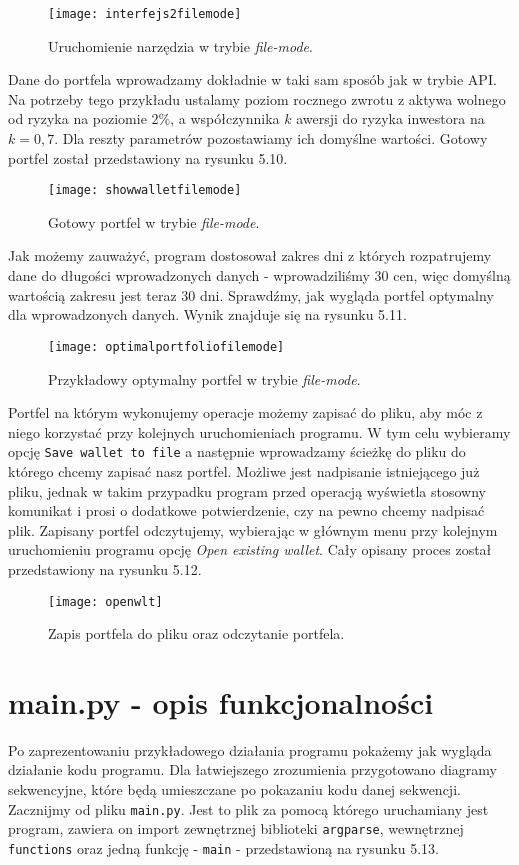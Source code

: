 \documentclass[magister]{dyplom}
\def\code#1{\texttt{#1}}
\begin{document}
\begin{figure}[ht!]
	\centering
	\texttt{[image: interfejs2filemode]}
	\caption{Uruchomienie narzędzia w trybie \textit{file-mode}.}
\end{figure}


Dane do portfela wprowadzamy dokładnie w taki sam sposób jak w trybie API. Na potrzeby tego przykładu ustalamy poziom rocznego zwrotu z aktywa wolnego od ryzyka na poziomie $2 \%$, a współczynnika $k$ awersji do ryzyka inwestora na $k=0,7$. Dla reszty parametrów pozostawiamy ich domyślne wartości. Gotowy portfel został przedstawiony na rysunku 5.10.

\begin{figure}[ht]
	\centering
	\texttt{[image: showwalletfilemode]}
	\caption{Gotowy portfel w trybie \textit{file-mode}.}
\end{figure}
Jak możemy zauważyć, program dostosował zakres dni z których rozpatrujemy dane do długości wprowadzonych danych - wprowadziliśmy 30 cen, więc domyślną wartością zakresu jest teraz 30 dni.
Sprawdźmy, jak wygląda portfel optymalny dla wprowadzonych danych. Wynik znajduje się na rysunku 5.11.
\newpage
\begin{figure}[ht!]
	\centering
	\texttt{[image: optimalportfoliofilemode]}
	\caption{Przykładowy optymalny portfel w trybie \textit{file-mode}.}
\end{figure}

Portfel na którym wykonujemy operacje możemy zapisać do pliku, aby móc z niego korzystać przy kolejnych uruchomieniach programu. W tym celu wybieramy opcję \code{Save wallet to file} a następnie wprowadzamy ścieżkę do pliku do którego chcemy zapisać nasz portfel. Możliwe jest nadpisanie istniejącego już pliku, jednak w takim przypadku program przed operacją wyświetla stosowny komunikat i prosi o dodatkowe potwierdzenie, czy na pewno chcemy nadpisać plik. Zapisany portfel odczytujemy, wybierając w głównym menu przy kolejnym uruchomieniu programu opcję \textit{Open existing wallet}. Cały opisany proces został przedstawiony na rysunku 5.12.

\begin{figure}[ht!]
	\centering
	\texttt{[image: openwlt]}
	\caption{Zapis portfela do pliku oraz odczytanie portfela.}
\end{figure}
\newpage
\section{main.py - opis funkcjonalności}
Po zaprezentowaniu przykładowego działania programu pokażemy jak wygląda działanie kodu programu. Dla łatwiejszego zrozumienia przygotowano diagramy sekwencyjne, które będą umieszczane po pokazaniu kodu danej sekwencji.
Zacznijmy od pliku \code{main.py}. Jest to plik za pomocą którego uruchamiany jest program, zawiera on import zewnętrznej biblioteki \code{argparse}, wewnętrznej \code{functions} oraz jedną funkcję - \code{main} - przedstawioną na rysunku 5.13.
\end{document}
